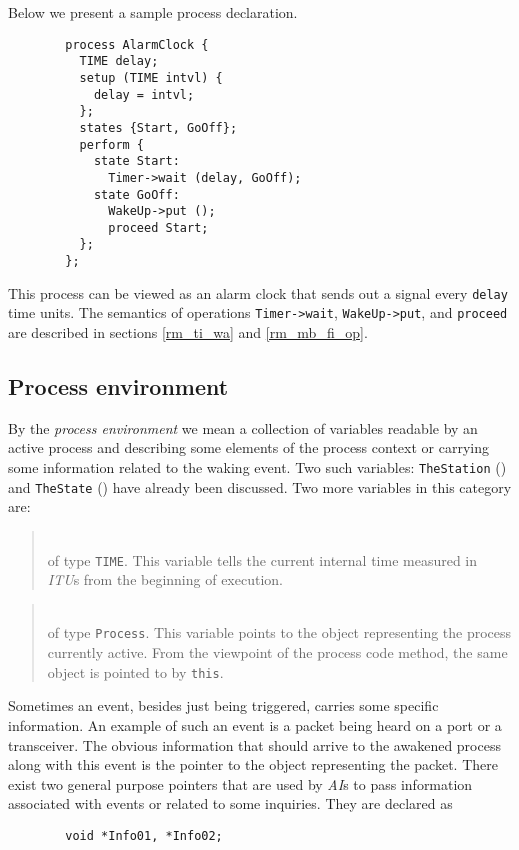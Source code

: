 \noindent
Below we present a sample process declaration.
\begin{verbatim}
        process AlarmClock {
          TIME delay;
          setup (TIME intvl) {
            delay = intvl;
          };
          states {Start, GoOff};
          perform {
            state Start:
              Timer->wait (delay, GoOff);
            state GoOff:
              WakeUp->put ();
              proceed Start;
          };
        };
\end{verbatim}

This process can be viewed as an alarm clock that sends out a signal
every {\tt delay} time units.
The semantics of operations {\tt Timer->wait}, {\tt WakeUp->put}, and
{\tt proceed} are described in sections \ref{rm_ti_wa} and \ref{rm_mb_fi_op}.

\subsection{Process environment}
\label{rm_pr_en}

By the {\em process environment\/} we mean a collection of variables
readable by an active process and describing some elements of the
process context or carrying some information related to the waking
event.
Two such variables: {\tt TheStation} () and
{\tt TheState} () have already been discussed.
Two more variables in this category are:

\medskip

\begin{quote}
\noindent{}\\ \hspace{0in}
of type {\tt TIME}.
This variable
tells the current internal time measured in {\em ITU\/}s from the
beginning of execution.
\end{quote}

\begin{quote}
\noindent{}\\ \hspace{0in}
of type {\tt Process}.
This variable points to the object representing the process currently active.
From the viewpoint of the process code method, the same object is pointed
to by {\tt this}.
\end{quote}\medskip

Sometimes an event, besides just being triggered, carries some specific
information.
An example of such an event is a packet being heard on a port or
a transceiver.
The obvious information that should arrive to the awakened process
along with this event is the pointer to the object representing the packet.
There exist two general purpose pointers that are used by {\em AI\/}s
to pass information associated with events or related to some inquiries.
They are declared as
\begin{verbatim}
        void *Info01, *Info02;
\end{verbatim}

